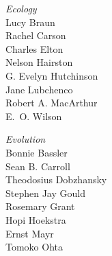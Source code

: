 \documentclass[12pt, addpoints, hidelinks]{exam}
\begin{document}
\begin{multicols}{2}
\textit{Ecology} \\
Lucy Braun \\
Rachel Carson \\
Charles Elton \\
Nelson Hairston\\
G. Evelyn Hutchinson\\
Jane Lubchenco \\
Robert A. MacArthur \\
E.~O. Wilson 

\columnbreak

\textit{Evolution}\\
Bonnie Bassler \\
Sean B. Carroll \\ 
Theodosius Dobzhansky \\
Stephen Jay Gould \\
Rosemary Grant \\
Hopi Hoekstra \\
Ernst Mayr \\
Tomoko Ohta 
\end{multicols}
\end{document}
